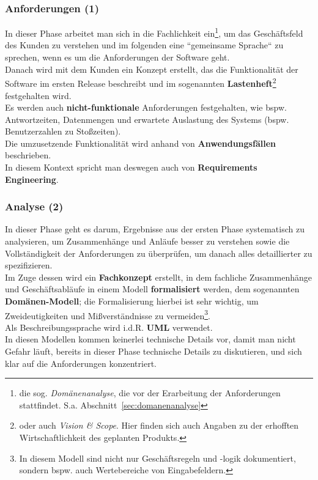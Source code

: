 \subsubsection{Anforderungen (1)}
In dieser Phase arbeitet man sich in die Fachlichkeit ein\footnote{
die sog. \textit{Domänenanalyse}, die vor der Erarbeitung der Anforderungen stattfindet. S.a. Abschnitt~\ref{sec:domanenanalyse}
}, um das Geschäftsfeld des Kunden zu verstehen und im folgenden eine ``gemeinsame Sprache`` zu sprechen, wenn es um die Anforderungen der Software geht.\\
Danach wird mit dem Kunden ein Konzept erstellt, das die Funktionalität der Software im ersten Release beschreibt und im sogenannten \textbf{Lastenheft}\footnote{
oder auch \textit{Vision \& Scope}. Hier finden sich auch Angaben zu der erhofften Wirtschaftlichkeit des geplanten Produkts.
} festgehalten wird.\\
Es werden auch \textbf{nicht-funktionale} Anforderungen festgehalten, wie bspw. Antwortzeiten, Datenmengen und erwartete Auslastung des Systems (bspw. Benutzerzahlen zu Stoßzeiten).\\
Die umzusetzende Funktionalität wird anhand von \textbf{Anwendungsfällen} beschrieben.\\

\noindent
In diesem Kontext spricht man deswegen auch von \textbf{Requirements Engineering}.


\subsubsection{Analyse (2)}
In dieser Phase geht es darum, Ergebnisse aus der ersten Phase systematisch zu analysieren, um Zusammenhänge und Anläufe besser zu verstehen sowie die Vollständigkeit der Anforderungen zu überprüfen, um danach alles detaillierter zu spezifizieren.\\
Im Zuge dessen wird ein \textbf{Fachkonzept} erstellt, in dem fachliche Zusammenhänge und Geschäftsabläufe in einem Modell \textbf{formalisiert} werden, dem sogenannten \textbf{Domänen-Modell}; die Formalisierung hierbei ist sehr wichtig, um Zweideutigkeiten und Mißverständnisse zu vermeiden\footnote{
    In diesem Modell sind nicht nur Geschäftsregeln und -logik dokumentiert, sondern bspw. auch Wertebereiche von Eingabefeldern.
}.\\
Als Beschreibungssprache wird i.d.R. \textbf{UML} verwendet.\\

\noindent
In diesen  Modellen kommen keinerlei technische Details vor, damit man nicht Gefahr läuft, bereits in dieser Phase technische Details zu diskutieren, und sich klar auf die Anforderungen konzentriert.\\

